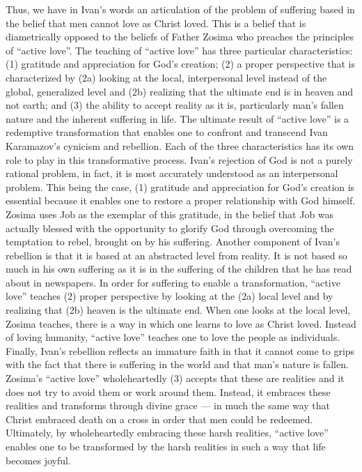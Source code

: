 Thus, we have in Ivan's words an articulation of the problem of suffering based in the belief that men cannot love as Christ loved. This is a belief that is diametrically opposed to the beliefs of Father Zosima who preaches the principles of ``active love''. The teaching of ``active love'' has three particular characteristics: (1) gratitude and appreciation for God's creation; (2) a proper perspective that is characterized by (2a) looking at the local, interpersonal level instead of the global, generalized level and (2b) realizing that the ultimate end is in heaven and not earth; and (3) the ability to accept reality as it is, particularly man's fallen nature and the inherent suffering in life. The ultimate result of ``active love'' is a redemptive transformation that enables one to confront and transcend Ivan Karamazov's cynicism and rebellion. Each of the three characteristics has its own role to play in this transformative process. Ivan's rejection of God is not a purely rational problem, in fact, it is most accurately understood as an interpersonal problem. This being the case, (1) gratitude and appreciation for God's creation is essential because it enables one to restore a proper relationship with God himself. Zosima uses Job as the exemplar of this gratitude, in the belief that Job was actually blessed with the opportunity to glorify God through overcoming the temptation to rebel, brought on by his suffering. Another component of Ivan's rebellion is that it is based at an abstracted level from reality. It is not based so much in his own suffering as it is in the suffering of the children that he has read about in newspapers. In order for suffering to enable a transformation, ``active love'' teaches (2) proper perspective by looking at the (2a) local level and by realizing that (2b) heaven is the ultimate end. When one looks at the local level, Zosima teaches, there is a way in which one learns to love as Christ loved. Instead of loving humanity, ``active love'' teaches one to love the people as individuals. Finally, Ivan's rebellion reflects an immature faith in that it cannot come to grips with the fact that there is suffering in the world and that man's nature is fallen. Zosima's ``active love'' wholeheartedly (3) accepts that these are realities and it does not try to avoid them or work around them. Instead, it embraces these realities and transforms through divine grace --- in much the same way that Christ embraced death on a cross in order that men could be redeemed. Ultimately, by wholeheartedly embracing these harsh realities, ``active love'' enables one to be transformed by the harsh realities in such a way that life becomes joyful.

